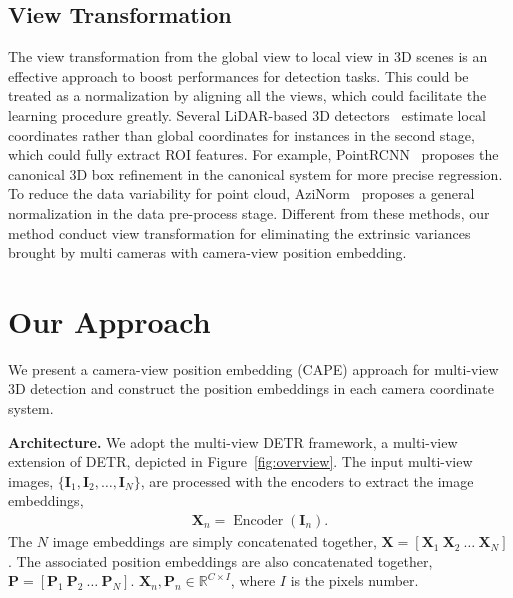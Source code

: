 \documentclass[10pt,twocolumn,letterpaper]{article}
\begin{document}
\subsection{View Transformation}
The view transformation from the global view to local view in 3D scenes is an effective approach to boost performances for detection tasks. This could be treated as a normalization by aligning all the views, which could facilitate the learning procedure greatly.
Several LiDAR-based 3D detectors~\cite{shi2019pointrcnn, qi2018frustum, shi2020points, meyer2019lasernet, fan2021rangedet} estimate local coordinates rather than global coordinates for instances in the second stage, which could fully extract ROI features. 
For example, PointRCNN~\cite{shi2019pointrcnn} proposes the canonical 3D box refinement in the canonical system for more precise regression. 
To reduce the data variability for point cloud, AziNorm~\cite{chen2022azinorm} proposes a general normalization in the data pre-process stage.
Different from these methods, our method conduct view transformation for eliminating the extrinsic variances brought by multi cameras with camera-view position embedding.
%
 








\section{Our Approach}
We present a camera-view position embedding (CAPE) approach for multi-view 3D detection 
and construct the position embeddings
in each camera coordinate system.

\vspace{2mm}
\noindent\textbf{Architecture.}
We adopt the multi-view DETR framework,
a multi-view extension of DETR,
depicted in Figure~\ref{fig:overview}.
The input multi-view images,
$\{\mathbf{I}_1, \mathbf{I}_2,
\dots, \mathbf{I}_N\}$, 
are processed with the encoders to extract the image embeddings,
\begin{align}
\mathbf{X}_n = 
\operatorname{Encoder}(\mathbf{I}_n).
\end{align}
The $N$ image embeddings
are simply concatenated together,
$\mathbf{X}=[\mathbf{X}_1~\mathbf{X}_2~\dots~\mathbf{X}_N]$.
The associated position embeddings
are also concatenated together,
$\mathbf{P} = [\mathbf{P}_1~\mathbf{P}_2~\dots~\mathbf{P}_N]$. $\mathbf{X}_n, \mathbf{P}_n\in \mathbb{R}^{C\times I}$, where $I$ is the pixels number.
\end{document}
